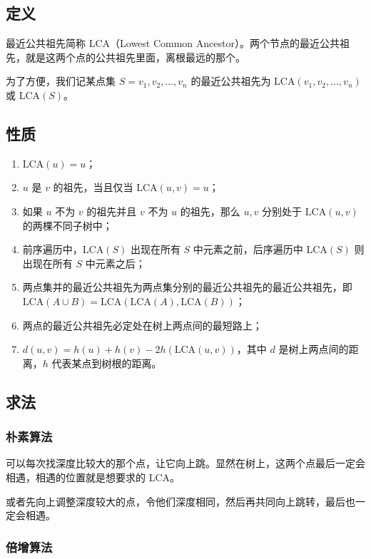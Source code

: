 
\subsection{定义}

最近公共祖先简称 LCA（Lowest Common Ancestor）。两个节点的最近公共祖先，就是这两个点的公共祖先里面，离根最远的那个。  

为了方便，我们记某点集 $S={v_1,v_2,\ldots,v_n}$ 的最近公共祖先为 $\text{LCA}(v_1,v_2,\ldots,v_n)$ 或 $\text{LCA}(S)$。

\subsection{性质}

\begin{enumerate}
\item $\text{LCA}({u})=u$；
\item $u$ 是 $v$ 的祖先，当且仅当 $\text{LCA}(u,v)=u$；
\item 如果 $u$ 不为 $v$ 的祖先并且 $v$ 不为 $u$ 的祖先，那么 $u,v$ 分别处于 $\text{LCA}(u,v)$ 的两棵不同子树中；
\item 前序遍历中，$\text{LCA}(S)$ 出现在所有 $S$ 中元素之前，后序遍历中 $\text{LCA}(S)$ 则出现在所有 $S$ 中元素之后；
\item 两点集并的最近公共祖先为两点集分别的最近公共祖先的最近公共祖先，即 $\text{LCA}(A\cup B)=\text{LCA}(\text{LCA}(A), \text{LCA}(B))$；
\item 两点的最近公共祖先必定处在树上两点间的最短路上；
\item $d(u,v)=h(u)+h(v)-2h(\text{LCA}(u,v))$，其中 $d$ 是树上两点间的距离，$h$ 代表某点到树根的距离。
\end{enumerate}

\subsection{求法}

\subsubsection{朴素算法}

可以每次找深度比较大的那个点，让它向上跳。显然在树上，这两个点最后一定会相遇，相遇的位置就是想要求的 LCA。  

或者先向上调整深度较大的点，令他们深度相同，然后再共同向上跳转，最后也一定会相遇。

\subsubsection{倍增算法}

